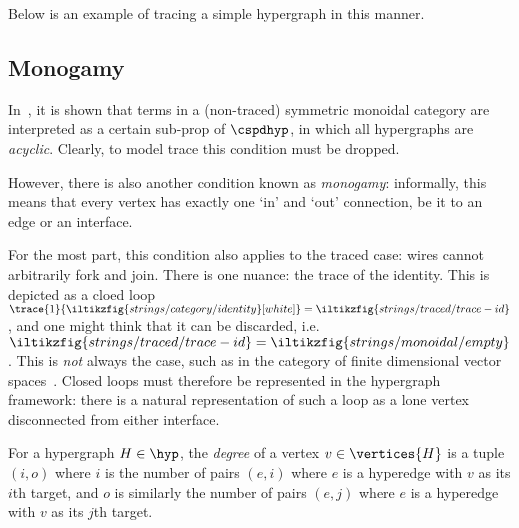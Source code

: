 \begin{example}
    Below is an example of tracing a simple hypergraph in this manner.
    \begin{center}
    \end{center}
\end{example}

\subsection{Monogamy}

In~\cite{bonchi2016rewriting}, it is shown that terms in a (non-traced)
symmetric monoidal category are interpreted as a certain sub-prop of
\(\cspdhyp\), in which all hypergraphs are \emph{acyclic}.
Clearly, to model trace this condition must be dropped.

However, there is also another condition known as \emph{monogamy}: informally,
this means that every vertex has exactly one `in' and `out' connection, be it to
an edge or an interface.

For the most part, this condition also applies to the traced case: wires cannot
arbitrarily fork and join.
There is one nuance: the trace of the identity.
This is depicted as a cloed loop \(
    \trace{1}{\iltikzfig{strings/category/identity}[white]}
    =
    \iltikzfig{strings/traced/trace-id}
\), and one might think that it can be discarded, i.e. \(
    \iltikzfig{strings/traced/trace-id}
    =
    \iltikzfig{strings/monoidal/empty}
\).
This is \emph{not} always the case, such as in the category of finite
dimensional vector spaces~\cite[Sec. 6.1]{hasegawa1997recursion}.
Closed loops must therefore be represented in the hypergraph framework:
there is a natural representation of such a loop as a lone vertex disconnected
from either interface.

\begin{definition}
    For a hypergraph \(H \in \hyp\), the \emph{degree} of a vertex
    \(v \in \vertices{H}\) is a tuple \((i,o)\) where \(i\) is the number of
    pairs \((e,i)\) where \(e\) is a hyperedge with \(v\) as its \(i\)th target,
    and \(o\) is similarly the number of pairs \((e,j)\) where \(e\) is a
    hyperedge with \(v\) as its \(j\)th target.
\end{definition}

